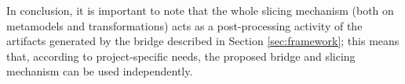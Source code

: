 In conclusion, it is important to note that the whole slicing mechanism (both on metamodels and transformations)
acts as a post-processing activity of the artifacts generated by the bridge described in Section \ref{sec:framework}; this means that, according to project-specific needs, the proposed bridge and slicing mechanism can be used independently.


